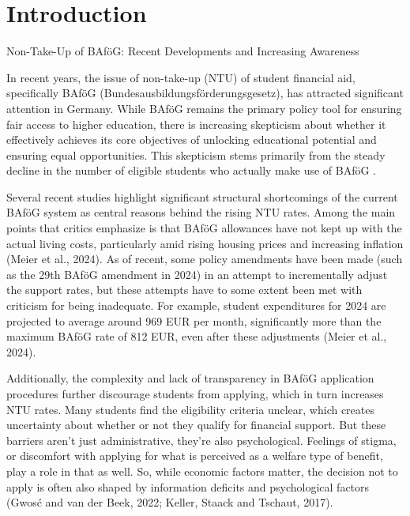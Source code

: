 \section{Introduction} \label{sec:intro}

Non-Take-Up of BAföG: Recent Developments and Increasing Awareness

In recent years, the issue of non-take-up (NTU) of student financial aid, specifically BAföG (Bundesausbildungsförderungsgesetz), has attracted significant attention in Germany. While BAföG remains the primary policy tool for ensuring fair access to higher education, there is increasing skepticism about whether it effectively achieves its core objectives of unlocking educational potential and ensuring equal opportunities. This skepticism stems primarily from the steady decline in the number of eligible students who actually make use of BAföG \citep{gwosc_krisenbewaltigung_2022, meier_bafog_2024}.

Several recent studies highlight significant structural shortcomings of the current BAföG system as central reasons behind the rising NTU rates. Among the main points that critics emphasize is that BAföG allowances have not kept up with the actual living costs, particularly amid rising housing prices and increasing inflation (Meier et al., 2024). As of recent, some policy amendments have been made (such as the 29th BAföG amendment in 2024) in an attempt to incrementally adjust the support rates, but these attempts have to some extent been met with criticism for being inadequate. For example, student expenditures for 2024 are projected to average around 969 EUR per month, significantly more than the maximum BAföG rate of 812 EUR, even after these adjustments (Meier et al., 2024).

Additionally, the complexity and lack of transparency in BAföG application procedures further discourage students from applying, which in turn increases NTU rates. Many students find the eligibility criteria unclear, which creates uncertainty about whether or not they qualify for financial support. But these barriers aren’t just administrative, they’re also psychological. Feelings of stigma, or discomfort with applying for what is perceived as a welfare type of benefit, play a role in that as well. So, while economic factors matter, the decision not to apply is often also shaped by information deficits and psychological factors (Gwosć and van der Beek, 2022; Keller, Staack and Tschaut, 2017).

